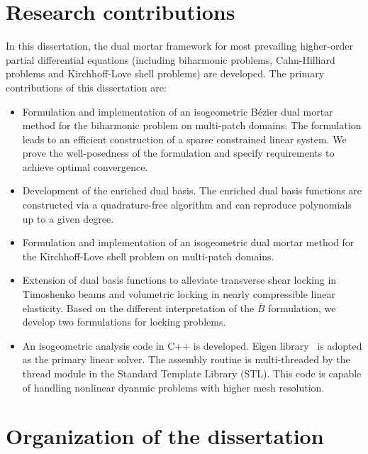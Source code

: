 \section{Research contributions}

In this dissertation, the dual mortar framework for most prevailing higher-order partial differential equations (including biharmonic problems, Cahn-Hilliard problems and Kirchhoff-Love shell problems) are developed. The primary contributions of this dissertation are:
\begin{itemize}
    \item Formulation and implementation of an isogeometric B\'ezier dual mortar method for the biharmonic problem on multi-patch domains. The formulation leads to an efficient construction of a sparse constrained linear system. We prove the well-posedness of the formulation and specify requirements to achieve optimal convergence. 
    \item Development of the enriched \Bezier dual basis. The enriched \Bezier dual basis functions are constructed via a quadrature-free algorithm and can reproduce polynomials up to a given degree. 
    \item Formulation and implementation of an isogeometric \Bezier dual mortar method for the Kirchhoff-Love shell problem on multi-patch domains. 
    \item Extension of \Bezier dual basis functions to alleviate transverse shear locking in Timoshenko beams and volumetric locking in nearly compressible linear elasticity. Based on the different interpretation of the $\bar{B}$ formulation, we develop two formulations for locking problems.
    \item An isogeometric analysis code in C++ is developed. Eigen library~\cite{eigenweb} is adopted as the primary linear solver. The assembly routine is multi-threaded by the thread module in the Standard Template Library (STL). This code is capable of handling nonlinear dyanmic problems with higher mesh resolution. 
\end{itemize}

\section{Organization of the dissertation}

